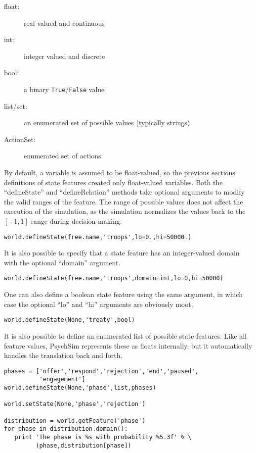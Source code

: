 \documentclass{article}
\begin{document}
\begin{description}
\item[float:] real valued and continuous
\item[int:] integer valued and discrete
\item[bool:] a binary {\tt True}/{\tt False} value
\item[list/set:] an enumerated set of possible values (typically strings)
\item[ActionSet:] enumerated set of actions
\end{description}

By default, a variable is assumed to be float-valued, so the previous sections definitions of state features created only float-valued variables. Both the ``defineState'' and ``defineRelation'' methods take optional arguments to modify the valid ranges of the feature. The range of possible values does not affect the execution of the simulation, as the simulation normalizes the values back to the $[-1,1]$ range during decision-making.

\begin{verbatim}
world.defineState(free.name,'troops',lo=0.,hi=50000.)
\end{verbatim}

It is also possible to specify that a state feature has an integer-valued domain with the optional ``domain'' argument.

\begin{verbatim}
world.defineState(free.name,'troops',domain=int,lo=0,hi=50000)
\end{verbatim}

One can also define a boolean state feature using the same argument, in which case the optional ``lo'' and ``hi'' arguments are obviously moot.

\begin{verbatim}
world.defineState(None,'treaty',bool)
\end{verbatim}

It is also possible to define an enumerated list of possible state features. Like all feature values, PsychSim represents these as floats internally, but it automatically handles the translation back and forth.

\begin{verbatim}
phases = ['offer','respond','rejection','end','paused',
          'engagement']
world.defineState(None,'phase',list,phases)

world.setState(None,'phase','rejection')

distribution = world.getFeature('phase')
for phase in distribution.domain():
   print 'The phase is %s with probability %5.3f' % \
         (phase,distribution[phase])
\end{verbatim}
\end{document}
